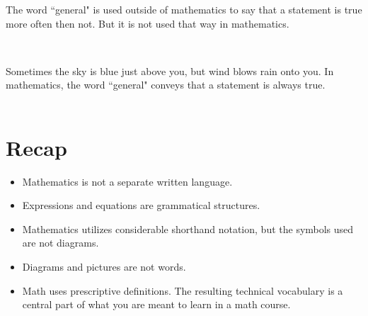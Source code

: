 \documentclass[12pt]{article}
\def\thup{\rightthumbsup}
\def\thdn{\rightthumbsdown}
\begin{document}
\begin{center}
\thup
\end{center}


The word ``general" is used outside of mathematics to say that a statement is true more often then not. But it is not used that way in mathematics.

\begin{center}
~\thdn
\end{center}
Sometimes the sky is blue just above you, but wind blows rain onto you. In mathematics, the word ``general" conveys that a statement is always true. \\


~\thup









\section{Recap}
\begin{itemize}

\item Mathematics is not a separate written language. 
\item Expressions and equations are grammatical structures. 
\item Mathematics utilizes considerable shorthand notation, but the symbols used are not diagrams. 
\item Diagrams and pictures are not words.
\item Math uses prescriptive definitions. The resulting technical vocabulary is a central part of what you are meant to learn in a math course. 
\end{itemize}
%
%
%
%
\end{document}
